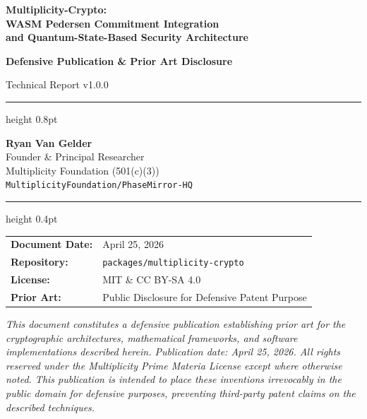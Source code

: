 \documentclass[11pt,letterpaper]{article}
\begin{document}
\begin{titlepage}
\centering
\vspace*{2cm}
{\Huge\bfseries\color{mfblue}
  Multiplicity-Crypto:\\[0.4em]
  WASM Pedersen Commitment Integration\\[0.3em]
  and Quantum-State-Based Security Architecture
\par}
\vspace{1.2cm}
{\large\textbf{Defensive Publication \& Prior Art Disclosure}\par}
\vspace{0.4cm}
{\large\textcolor{mfgray}{Technical Report v1.0.0}\par}
\vspace{1.4cm}
\hrule height 0.8pt
\vspace{0.6cm}
{\large
  \textbf{Ryan Van Gelder}\\[0.2em]
  \textcolor{mfgray}{Founder \& Principal Researcher}\\[0.2em]
  Multiplicity Foundation (501(c)(3))\\[0.2em]
  \texttt{MultiplicityFoundation/PhaseMirror-HQ}
\par}
\vspace{0.6cm}
\hrule height 0.4pt
\vspace{1.6cm}
{\normalsize
\begin{tabular}{ll}
  \textbf{Document Date:} & April 25, 2026 \\
  \textbf{Repository:}    & \texttt{packages/multiplicity-crypto} \\
  \textbf{License:}       & MIT \& CC BY-SA 4.0 \\
  \textbf{Prior Art:}     & Public Disclosure for Defensive Patent Purpose \\
\end{tabular}
\par}
\vspace{2cm}
\begin{mdframed}[linecolor=mfblue,linewidth=1.2pt,innertopmargin=8pt,innerbottommargin=8pt]
\small\textit{This document constitutes a defensive publication establishing prior art
for the cryptographic architectures, mathematical frameworks, and software
implementations described herein. Publication date: April 25, 2026. All rights
reserved under the Multiplicity Prime Materia License except where otherwise noted.
This publication is intended to place these inventions irrevocably in the public
domain for defensive purposes, preventing third-party patent claims on the described
techniques.}
\end{mdframed}
\end{titlepage}
\end{document}
